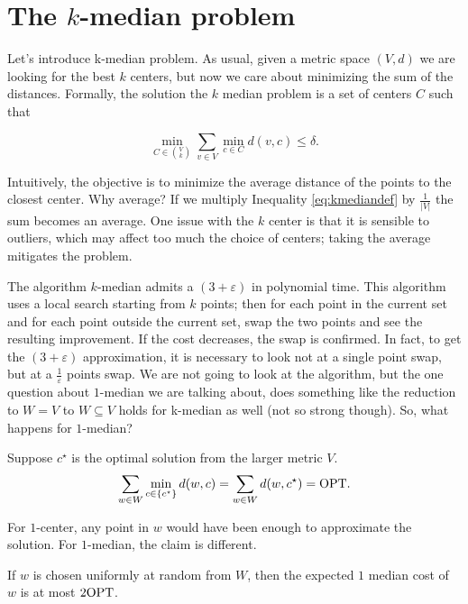 \section{The $k$-median problem}

Let's introduce k-median problem. As usual, given a metric space $(V, d)$ we are looking for the best $k$ centers, but now we care about minimizing the sum of the distances. Formally, the solution the $k$ median problem is a set of centers $C$ such that

\begin{equation}\label{eq:kmediandef}
	\min_{C \in \binom{V}{k}} \sum_{v \in V}\min_{c \in C}d(v, c) \leq \delta.
\end{equation} 

Intuitively, the objective is to minimize the average distance of the points to the closest center. Why average? If we multiply Inequality \ref{eq:kmediandef} by $\frac{1}{|V|}$ the sum becomes an average. One issue with the $k$ center is that it is sensible to outliers, which may affect too much the choice of centers; taking the average mitigates the problem.

The algorithm $k$-median admits a $(3+\varepsilon)$ in polynomial time. This algorithm uses a local search starting from $k$ points; then for each point in the current set and for each point outside the current set, swap the two points and see the resulting improvement. If the cost decreases, the swap is confirmed. In fact, to get the $(3 + \varepsilon)$ approximation, it is necessary to look not at a single point swap, but at a $\frac{1}{\varepsilon}$ points swap. We are not going to look at the algorithm, but the one question about $1$-median we are talking about, does something like the reduction to $W =V$ to $W \subseteq V$ holds for k-median as well (not so strong though). So, what happens for $1$-median?

Suppose $c^\star$ is the optimal solution from the larger metric $V$.
\begin{equation}
\sum_{w \in W} \min_{c \in \{c^\star\}} d(w, c) = \sum_{w \in W} d(w, c^\star) = \text{OPT}.
\end{equation}

For $1$-center, any point in $w$ would have been enough to approximate the solution. For $1$-median, the claim is different.

\begin{thm}
 If $w$ is chosen uniformly at random from $W$, then the expected $1$ median cost of $w$ is at most $2\text{OPT}$.
\end{thm}

